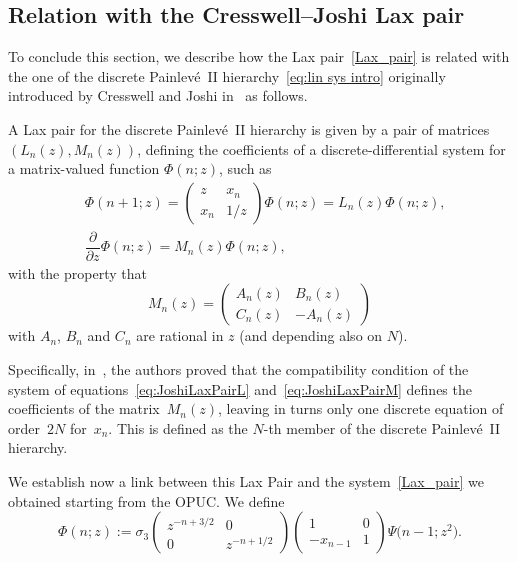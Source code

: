\documentclass[pdftex]{sigma}%
\numberwithin{equation}{section}
\begin{document}
\subsection{Relation with the Cresswell--Joshi Lax pair}
To conclude this section, we describe how the Lax pair~\eqref{Lax_pair} is related with the one of the discrete Painlev\'e~II hierarchy~\eqref{eq:lin sys intro} originally introduced by
	Cresswell and Joshi in~\cite{joshi1999discrete} as follows.
	\begin{Definition} 	
		 A Lax pair for the discrete Painlev\'e~II hierarchy is given by a pair of matrices $(L_n(z),M_n(z))$, defining the coefficients of a discrete-differential system for a matrix-valued function $\Phi(n;z)$, such as
		\begin{align}
			\label{eq:JoshiLaxPairL}
			&\Phi(n+1;z)=\begin{pmatrix}
				z & x_n\\
				x_n & 1/z
			\end{pmatrix}\Phi(n;z)=L_n(z)\Phi(n;z),\\
			\label{eq:JoshiLaxPairM}
			&\dfrac{\partial}{\partial z}\Phi(n;z)=M_n(z)\Phi(n;z),
		\end{align}
		with the property that \[ M_n(z)=\begin{pmatrix}
			A_n(z) & B_n(z)\\
			C_n(z) & -A_n(z)
		\end{pmatrix}\]
with $A_n$, $B_n$ and $C_n$ are rational in $z$ (and depending also on $N$).
	\end{Definition}

\begin{Remark}
Specifically, in~\cite[Section 3.1]{joshi1999discrete}, the authors proved that the compatibility condition of the system of equations~\eqref{eq:JoshiLaxPairL} and~\eqref{eq:JoshiLaxPairM} defines the coefficients of the matrix~$M_n(z)$, leaving in turns only one discrete equation of order~$2N$ for~$x_n$. This is defined as the $N$-th member of the discrete Painlev\'e~II hierarchy.
\end{Remark}

	We establish now a link between this Lax Pair and the system~\eqref{Lax_pair} we obtained starting from the OPUC. We define
			\begin{equation*}
		\Phi(n;z):=\sigma_3\begin{pmatrix}
		z^{-n+3/2} & 0\\
		0 & z^{-n+1/2}
	\end{pmatrix}\begin{pmatrix}
		1 & 0\\
		-x_{n-1} & 1
	\end{pmatrix}\Psi\big(n-1;z^2\big).
		\end{equation*}
\end{document}
